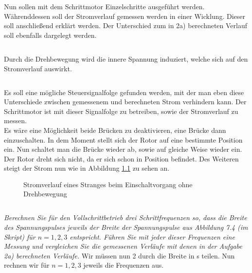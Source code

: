 \chapter{}\label{ch:aufg5}
Nun sollen mit dem Schrittmotor Einzelschritte ausgeführt werden. Währenddessen soll der Stromverlauf gemessen werden in einer Wicklung. Dieser soll anschließend erklärt werden. Der Unterschied zum in 2a) berechneten Verlauf soll ebenfalls dargelegt werden.

\section{}\label{sec:5a}
Durch die Drehbewegung wird die innere Spannung induziert, welche sich auf den Stromverlauf auswirkt. 

\section{}\label{sec:5b}
Es soll eine mögliche Steuersignalfolge gefunden werden, mit der man eben diese Unterschiede zwischen gemessenem und berechneten Strom verhindern kann. Der Schrittmotor ist mit dieser Signalfolge zu betreiben, sowie der Stromverlauf zu messen. \\
Es wäre eine Möglichkeit beide Brücken zu deaktivieren, eine Brücke dann einzuschalten. In dem Moment stellt sich der Rotor auf eine bestimmte Position ein. Nun schaltet man die Brücke wieder ab, sowie auf gleiche Weise wieder ein. Der Rotor dreht sich nicht, da er sich schon in Position befindet. Des Weiteren steigt der Strom nun wie in Abbildung \ref{fig:5b:strom} zu sehen an.
\begin{figure}[h]
	\centering
	
	\caption{Stromverlauf eines Stranges beim Einschaltvorgang ohne Drehbewegung}
	\label{fig:5b:strom}
\end{figure}

\section{}\label{sec:5c}
\textit{Berechnen Sie für den Vollschrittbetrieb drei Schrittfrequenzen so, dass die Breite des Spannungspulses jeweils der Breite der Spannungspulse aus Abbildung 7.4 (im Skript) für $ n = 1,2,3 $ entspricht. Führen Sie mit jeder dieser Frequenzen eine Messung und vergleichen Sie die gemessenen Verläufe mit denen in der Aufgabe 2a) berechneten Verläufe.}
Wir müssen nun 2 durch die Breite in s teilen. Nun rechnen wir für $ n = 1,2,3 $ jeweils die Frequenzen aus.

\begin{figure}
	\centering
	
\end{figure}

\begin{figure}
	\centering
	
\end{figure}

\begin{figure}
	\centering
	
\end{figure}
